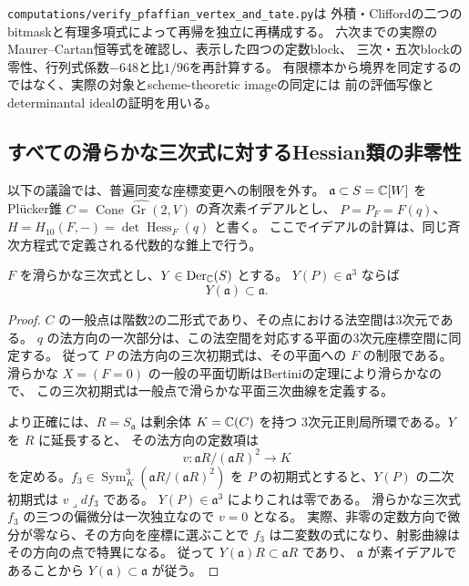 \begin{remark}[現行の厳密再現]
\texttt{computations/verify\_pfaffian\_vertex\_and\_tate.py}は
外積・Cliffordの二つのbitmaskと有理多項式によって再帰を独立に再構成する。
六次までの実際のMaurer--Cartan恒等式を確認し、表示した四つの定数block、
三次・五次blockの零性、行列式係数$-648$と比$1/96$を再計算する。
有限標本から境界を同定するのではなく、実際の対象とscheme-theoretic imageの同定には
前の評価写像とdeterminantal idealの証明を用いる。
\end{remark}

\subsection{すべての滑らかな三次式に対するHessian類の非零性}
\label{subsec:all-smooth-hessian}

以下の議論では、普遍同変な座標変更への制限を外す。
$\mathfrak a\subset S=\mathbb C[W]$ をPl\"ucker錐
$C=\widehat{\operatorname{Cone}\operatorname{Gr}(2,V)}$ の斉次素イデアルとし、
$P=P_F=F(q)$、$H=H_{10}(F,-)=\det\operatorname{Hess}_F(q)$ と書く。
ここでイデアルの計算は、同じ斉次方程式で定義される代数的な錐上で行う。

\begin{lemma}[三次の位数を保つベクトル場の接性]
\label{lem:cubic-order-forces-tangency}
$F$ を滑らかな三次式とし、$Y\in\operatorname{Der}_{\mathbb C}(S)$ とする。
$Y(P)\in\mathfrak a^3$ ならば
\[
 Y(\mathfrak a)\subset\mathfrak a.
\]
\end{lemma}
\begin{proof}
$C$ の一般点は階数2の二形式であり、その点における法空間は3次元である。
$q$ の法方向の一次部分は、この法空間を対応する平面の3次元座標空間に同定する。
従って $P$ の法方向の三次初期式は、その平面への $F$ の制限である。
滑らかな $X=(F=0)$ の一般の平面切断はBertiniの定理により滑らかなので、
この三次初期式は一般点で滑らかな平面三次曲線を定義する。

より正確には、$R=S_{\mathfrak a}$ は剰余体 $K=\mathbb C(C)$ を持つ
3次元正則局所環である。$Y$ を $R$ に延長すると、
その法方向の定数項は
\[
 v\colon\mathfrak aR/(\mathfrak aR)^2\longrightarrow K
\]
を定める。$f_3\in\operatorname{Sym}^3_K(\mathfrak aR/(\mathfrak aR)^2)$
を $P$ の初期式とすると、$Y(P)$ の二次初期式は $v\lrcorner df_3$ である。
$Y(P)\in\mathfrak a^3$ によりこれは零である。
滑らかな三次式 $f_3$ の三つの偏微分は一次独立なので $v=0$ となる。
実際、非零の定数方向で微分が零なら、その方向を座標に選ぶことで
$f_3$ は二変数の式になり、射影曲線はその方向の点で特異になる。
従って $Y(\mathfrak a)R\subset\mathfrak aR$ であり、
$\mathfrak a$ が素イデアルであることから $Y(\mathfrak a)\subset\mathfrak a$ が従う。
\end{proof}


